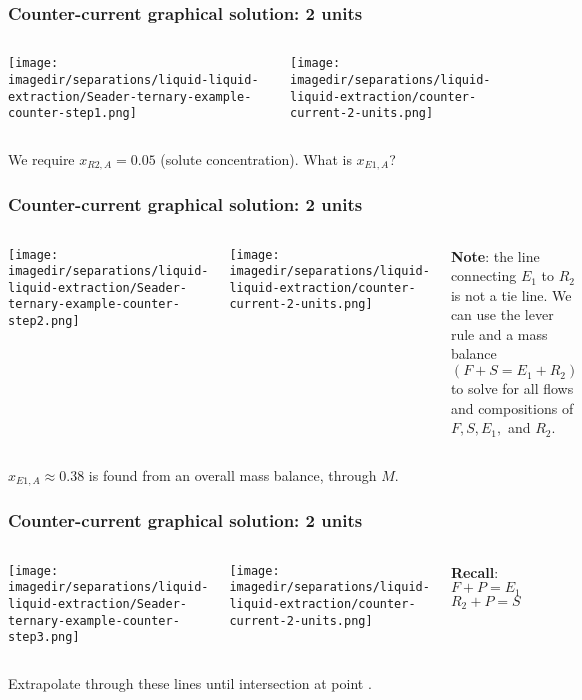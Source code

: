 \begin{frame}\frametitle{Counter-current graphical solution: 2 units}
	\begin{columns}[t]
			\begin{center}
				\texttt{[image: \\imagedir/separations/liquid-liquid-extraction/Seader-ternary-example-counter-step1.png]}
			\end{center}
			\begin{center}
				\texttt{[image: \\imagedir/separations/liquid-liquid-extraction/counter-current-2-units.png]}
			\end{center}
	\end{columns}
	\vspace{12pt}
	We require $x_{R2,A} = 0.05$ (solute concentration). What is $x_{E1,A}$?	
	\vfill
\end{frame}

\begin{frame}\frametitle{Counter-current graphical solution: 2 units}
	\begin{columns}[t]
			\begin{center}
				\texttt{[image: \\imagedir/separations/liquid-liquid-extraction/Seader-ternary-example-counter-step2.png]}
			\end{center}
			\begin{center}
				\texttt{[image: \\imagedir/separations/liquid-liquid-extraction/counter-current-2-units.png]}
			\end{center}
			\textbf{Note}: the line connecting $E_1$ to $R_2$ is not a tie line. We can use the lever rule and a mass balance $(F + S = E_1 + R_2)$ to solve for all flows and compositions of $F, S, E_1,$ and $R_2$.
	\end{columns}
	\vspace{12pt}
	$x_{E1,A}\approx 0.38$ is found from an overall mass balance, through $M$.
	\vfill
\end{frame}

\begin{frame}\frametitle{Counter-current graphical solution: 2 units}
	\begin{columns}[t]
			\begin{center}
				\texttt{[image: \\imagedir/separations/liquid-liquid-extraction/Seader-ternary-example-counter-step3.png]}
			\end{center}
			\begin{center}
				\texttt{[image: \\imagedir/separations/liquid-liquid-extraction/counter-current-2-units.png]}
			\end{center}
			\textbf{Recall}: 
			\vspace{-12pt}
			\[	F + P = E_1 \]
			\[	R_2 + P = S \]			
	\end{columns}
	\vspace{12pt}
	Extrapolate through these lines until intersection at point {\color{myGreen}{$P$}}.
	\vfill
\end{frame}


